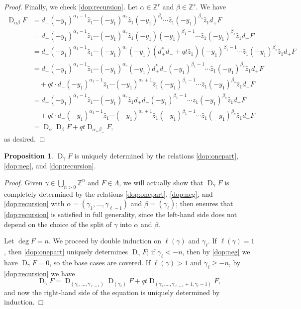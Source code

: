\documentclass[reqno]{amsart}
\theoremstyle{plain}
\theoremstyle{definition}
\newtheorem{proposition}[theorem]{Proposition}
\theoremstyle{remark}
\DeclareMathOperator{\D}{D}
\newcommand{\z}{\widehat{z}}
\newcommand{\<}{\langle}
\renewcommand{\>}{\rangle}
\begin{document}
\begin{proof}
    Finally, we check \eqref{dop:recursion}. Let $\alpha \in \mathbb{Z}^r$ and $\beta \in \mathbb{Z}^s$. We have
    \begin{align*}
        \D_{\alpha \beta} F & = d_- (-y_1)^{\alpha_1-1} \z_1 \cdots (-y_1)^{\alpha_r} \z_1 (-y_1)^{\beta_1} \cdots \z_1 (-y_1)^{\beta_s} \z_1 d_+ F \\
        & = d_- (-y_1)^{\alpha_1-1} \z_1 \cdots (-y_1)^{\alpha_r} \z_1 (-y_1) (-y_1)^{\beta_1-1} \cdots \z_1 (-y_1)^{\beta_s} \z_1 d_+ F \\
        & = d_- (-y_1)^{\alpha_1-1} \z_1 \cdots (-y_1)^{\alpha_r} (-y_1) (d_+^* d_- + qt \z_1) (-y_1)^{\beta_1-1} \cdots \z_1 (-y_1)^{\beta_s} \z_1 d_+ F \\
        & = d_- (-y_1)^{\alpha_1-1} \z_1 \cdots (-y_1)^{\alpha_r} (-y_1) d_+^* d_- (-y_1)^{\beta_1-1} \cdots \z_1 (-y_1)^{\beta_s} \z_1 d_+ F \\
        & \quad + qt \cdot d_- (-y_1)^{\alpha_1-1} \z_1 \cdots (-y_1)^{\alpha_r + 1} \z_1 (-y_1)^{\beta_1-1} \cdots \z_1 (-y_1)^{\beta_s} \z_1 d_+ F \\
        & = d_- (-y_1)^{\alpha_1-1} \z_1 \cdots (-y_1)^{\alpha_r} \z_1 d_+ d_- (-y_1)^{\beta_1-1} \cdots \z_1 (-y_1)^{\beta_s} \z_1 d_+ F \\
        & \quad + qt \cdot d_- (-y_1)^{\alpha_1-1} \z_1 \cdots (-y_1)^{\alpha_r + 1} \z_1 (-y_1)^{\beta_1-1} \cdots \z_1 (-y_1)^{\beta_s} \z_1 d_+ F \\
        & = \D_\alpha \D_\beta F + qt \D_{\alpha_+ \beta_-} F,
    \end{align*}
    as desired.
\end{proof}

\begin{proposition}
    \label{prop:dgamma-uniquely-determined}
    $\D_\gamma F$ is uniquely determined by the relations \eqref{dop:onepart}, \eqref{dop:neg}, and \eqref{dop:recursion}.
\end{proposition}

\begin{proof}
    Given $\gamma \in \bigcup_{n > 0} \mathbb{Z}^n$ and $F \in \Lambda$, we will actually show that $\D_\gamma F$ is completely determined by the relations \eqref{dop:onepart}, \eqref{dop:neg}, and \eqref{dop:recursion} with $\alpha = (\gamma_1, \dots, \gamma_{\ell-1})$ and $\beta = (\gamma_\ell)$; then  ensures that \eqref{dop:recursion} is satisfied in full generality, since the left-hand side does not depend on the choice of the split of $\gamma$ into $\alpha$ and $\beta$.

    Let $\deg F = n$. We proceed by double induction on $\ell(\gamma)$ and $\gamma_\ell$. If $\ell(\gamma) = 1$, then \eqref{dop:onepart} uniquely determines $\D_\gamma F$; if $\gamma_\ell < -n$, then by \eqref{dop:neg} we have $\D_\gamma F = 0$, so the base cases are covered. If $\ell(\gamma) > 1$ and $\gamma_\ell \geq -n$, by \eqref{dop:recursion} we have \[ \D_\gamma F = \D_{(\gamma_1, \dots, \gamma_{\ell-1})} \D_{(\gamma_\ell)} F + qt \D_{(\gamma_1, \dots, \gamma_{\ell-1}+1, \gamma_\ell-1)} F, \] and now the right-hand side of the equation is uniquely determined by induction.
\end{proof}
\end{document}
